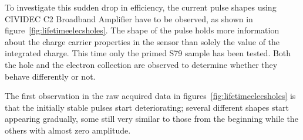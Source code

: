 

To investigate this sudden drop in efficiency, the current pulse shapes using CIVIDEC C2 Broadband Amplifier have to be observed, as shown in figure~\ref{fig:lifetimeelecsholes}. The shape of the pulse holds more information about the charge carrier properties in the sensor than solely the value of the integrated charge. This time only the primed S79 sample has been tested. Both the hole and the electron collection are observed to determine whether they behave differently or not. 

The first observation in the raw acquired data in figures~\ref{fig:lifetimeelecsholes} is that the initially stable pulses start deteriorating; several different shapes start appearing gradually, some still very similar to those from the beginning while the others with almost zero amplitude. 

